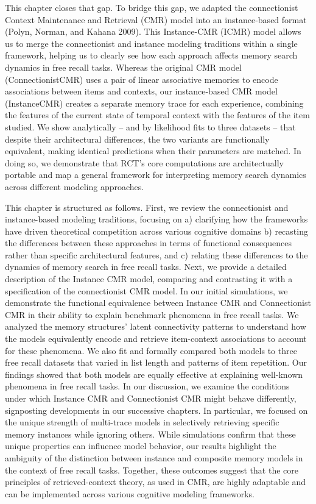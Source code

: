 \documentclass[
  letterpaper,
  11pt,
  english,
  singlespacing,
  headsepline]{MastersDoctoralThesis}
\begin{document}
This chapter closes that gap. To bridge this gap, we adapted the
connectionist Context Maintenance and Retrieval (CMR) model into an
instance-based format (Polyn, Norman, and Kahana 2009). This
Instance-CMR (ICMR) model allows us to merge the connectionist and
instance modeling traditions within a single framework, helping us to
clearly see how each approach affects memory search dynamics in free
recall tasks. Whereas the original CMR model (ConnectionistCMR) uses a
pair of linear associative memories to encode associations between items
and contexts, our instance-based CMR model (InstanceCMR) creates a
separate memory trace for each experience, combining the features of the
current state of temporal context with the features of the item studied.
We show analytically -- and by likelihood fits to three datasets -- that
despite their architectural differences, the two variants are
functionally equivalent, making identical predictions when their
parameters are matched. In doing so, we demonstrate that RCT's core
computations are architectually portable and map a general framework for
interpreting memory search dynamics across different modeling
approaches.

This chapter is structured as follows. First, we review the
connectionist and instance-based modeling traditions, focusing on a)
clarifying how the frameworks have driven theoretical competition across
various cognitive domains b) recasting the differences between these
approaches in terms of functional consequences rather than specific
architectural features, and c) relating these differences to the
dynamics of memory search in free recall tasks. Next, we provide a
detailed description of the Instance CMR model, comparing and
contrasting it with a specification of the connectionist CMR model. In
our initial simulations, we demonstrate the functional equivalence
between Instance CMR and Connectionist CMR in their ability to explain
benchmark phenomena in free recall tasks. We analyzed the memory
structures' latent connectivity patterns to understand how the models
equivalently encode and retrieve item-context associations to account
for these phenomena. We also fit and formally compared both models to
three free recall datasets that varied in list length and patterns of
item repetition. Our findings showed that both models are equally
effective at explaining well-known phenomena in free recall tasks. In
our discussion, we examine the conditions under which Instance CMR and
Connectionist CMR might behave differently, signposting developments in
our successive chapters. In particular, we focused on the unique
strength of multi-trace models in selectively retrieving specific memory
instances while ignoring others. While simulations confirm that these
unique properties can influence model behavior, our results highlight
the ambiguity of the distinction between instance and composite memory
models in the context of free recall tasks. Together, these outcomes
suggest that the core principles of retrieved-context theory, as used in
CMR, are highly adaptable and can be implemented across various
cognitive modeling frameworks.
\end{document}
